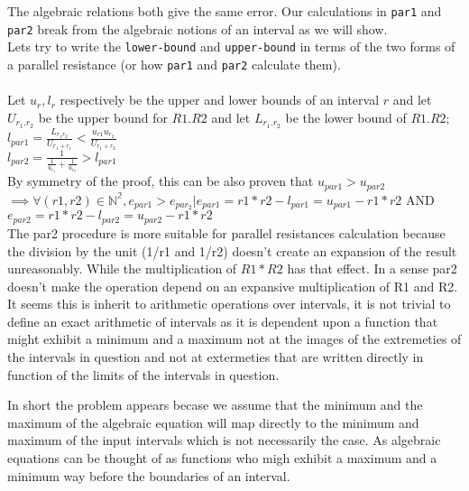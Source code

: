 \documentclass{article}
\begin{document}
\noindent The algebraic relations both give the same error. Our calculations in \texttt{par1} and \texttt{par2} break from the algebraic notions  of an interval as we will show.\\
Lets try to write the \texttt{lower-bound} and \texttt{upper-bound} in terms of the two forms of a parallel resistance (or how \texttt{par1} and \texttt{par2} calculate them).\\ \\
Let $u_{r} , l_{r}$ respectively be the upper and lower bounds of an interval $r$ and let $U_{r_1.r_2}$  be the upper bound for $R1.R2$ and let $L_{r_1.r_2}$ be the lower bound of $R1 . R2;$\\
\noindent$l_{par1} =  \frac{L_{r_1r_2}}{U_{r_1+ r_1}} < \frac{u_{r1}u_{r_2}}{U_{r_1+r_2}} $\\
\noindent$ l_{par2} = \frac{1}{\frac{1}{u_{r_1}} + \frac{1}{u_{r_2}}} > l_{par1} $\\
By symmetry of the proof, this can be also proven that $u_{par1} > u_{par2}$\\
$\implies \forall (r1,r2) \in \mathbb{N^2}, e_{par1} > e_{par_2} | e_{par1} = r1*r2 - l_{par1} = u_{par1} - r1*r2 $ AND $ e_{par2} = r1*r2 - l_{par2} = u_{par2} - r1*r2 $\\
\noindent The par2 procedure is more suitable for parallel resistances calculation because the division by the unit (1/r1 and 1/r2) doesn't create an expansion of the result unreasonably. While the multiplication of $R1*R2$ has that effect. In a sense par2 doesn't make the operation depend on an expansive multiplication of R1 and R2. It seems this is inherit to arithmetic operations over intervals, it is not trivial to define an exact arithmetic of intervals as it is dependent upon a function that might exhibit a minimum and a maximum not at the images of the extremeties of the intervals in question and not at extermeties that are written directly in function of the limits of the intervals in question.

\noindent In short the problem appears becase we assume that the minimum and the maximum of the algebraic equation will map directly to the minimum and maximum of the input intervals which is not necessarily the case. As algebraic equations can be thought of as functions who migh exhibit a maximum and a minimum way before the boundaries of an interval.
\end{document}
